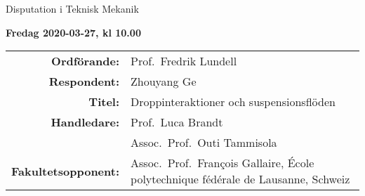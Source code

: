 \begin{frame}[plain]{Disputation i Teknisk Mekanik}
\protect\hypertarget{disputation-i-teknisk-mekanik}{}

\textbf{Fredag 2020-03-27, kl 10.00}

\begin{longtable}[]{@{}rl@{}}
  \toprule
  \endhead
  \begin{minipage}[t]{0.22\columnwidth}\raggedleft
    \textbf{Ordförande:}\strut
  \end{minipage} & \begin{minipage}[t]{0.72\columnwidth}\raggedright
    Prof.~Fredrik Lundell\strut
  \end{minipage}\tabularnewline
  \begin{minipage}[t]{0.22\columnwidth}\raggedleft
    \textbf{Respondent:}\strut
  \end{minipage} & \begin{minipage}[t]{0.72\columnwidth}\raggedright
    Zhouyang Ge\strut
  \end{minipage}\tabularnewline
  \begin{minipage}[t]{0.22\columnwidth}\raggedleft
    \textbf{Titel:}\strut
  \end{minipage} & \begin{minipage}[t]{0.72\columnwidth}\raggedright
    Droppinteraktioner och suspensionsflöden\strut
  \end{minipage}\tabularnewline
  \begin{minipage}[t]{0.22\columnwidth}\raggedleft
    \textbf{Handledare:}\strut
  \end{minipage} & \begin{minipage}[t]{0.72\columnwidth}\raggedright
    Prof.~Luca Brandt\strut
  \end{minipage}\tabularnewline
  \begin{minipage}[t]{0.22\columnwidth}\raggedleft
    \strut
  \end{minipage} & \begin{minipage}[t]{0.72\columnwidth}\raggedright
    Assoc.~Prof.~Outi Tammisola\strut
  \end{minipage}\tabularnewline
  \begin{minipage}[t]{0.22\columnwidth}\raggedleft
    \textbf{Fakultetsopponent:}\strut
  \end{minipage} & \begin{minipage}[t]{0.72\columnwidth}\raggedright
    Assoc.~Prof.~Fran\c{c}ois Gallaire, École polytechnique fédérale de Lausanne, Schweiz\strut

\end{minipage}
\end{longtable}
\end{frame}
